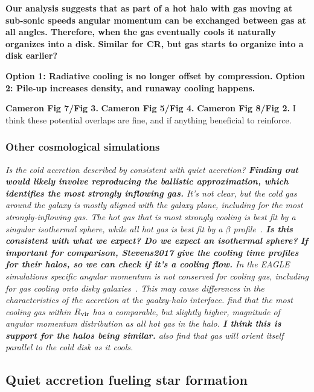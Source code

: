 \documentclass[fleqn,usenatbib]{mnras}
\begin{document}
\textbf{
Our analysis suggests that as part of a hot halo with gas moving at sub-sonic speeds angular momentum can be exchanged between gas at all angles.
Therefore, when the gas eventually cools it naturally organizes into a disk.
}
\textbf{
Similar for CR, but gas starts to organize into a disk earlier?
}

\textbf{Option 1: Radiative cooling is no longer offset by compression.}
\textbf{Option 2: Pile-up increases density, and runaway cooling happens.}

\textbf{Cameron Fig 7/Fig 3.}
\textbf{Cameron Fig 5/Fig 4.}
\textbf{Cameron Fig 8/Fig 2.}
I think these potential overlaps are fine, and if anything beneficial to reinforce.

\subsubsection{Other cosmological simulations}

\textit{
Is the cold accretion described by \cite{Ho2019} consistent with quiet accretion?
\textbf{Finding out would likely involve reproducing the ballistic approximation, which identifies the most strongly inflowing gas.}
It's not clear, but the cold gas around the galaxy is mostly aligned with the galaxy plane, including for the most strongly-inflowing gas.
The hot gas that is most strongly cooling is best fit by a singular isothermal sphere, while all hot gas is best fit by a $\beta$ profile~\citep{Stevens2017}.
\textbf{Is this consistent with what we expect? Do we expect an isothermal sphere?}
\textbf{If important for comparison, Stevens2017 give the cooling time profiles for their halos, so we can check if it's a cooling flow.}
In the EAGLE simulations specific angular momentum is not conserved for cooling gas, including for gas cooling onto disky galaxies~\citep{Stevens2017}.
This may cause differences in the characteristics of the accretion at the gaalxy-halo interface.
\cite{Stevens2017} find that the most cooling gas within $R_{\rm vir}$ has a comparable, but slightly higher, magnitude of angular momentum distribution as all hot gas in the halo.
\textbf{I think this is support for the halos being similar.}
\cite{Stevens2017} also find that gas will orient itself parallel to the cold disk as it cools.
}

\subsection{Quiet accretion fueling star formation}
\label{s: fueling}
\end{document}
